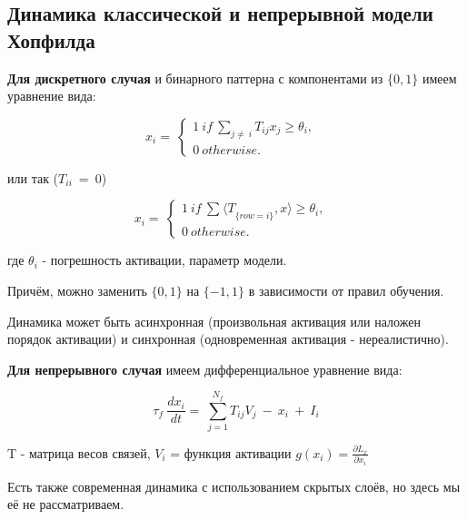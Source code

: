 
\subsection{\texorpdfstring{\textbf{
      Динамика классической и непрерывной модели Хопфилда}}
  {Динамика классической и непрерывной модели Хопфилда}}

\textbf{Для дискретного случая} и бинарного паттерна с компонентами из
\(\{ 0,1\}\) имеем уравнение вида:

\[
  x_{i} = \ \left\{ \begin{array}{r}
    1\ if\ \sum_{j \neq \ i}^{}{T_{ij}x_{j}} \geq \theta_{i},\ \ \\
    0\ otherwise.
  \end{array} \right.\
\]

или так (\(T_{ii}\  = \ 0\))


\[
  x_{i} = \ \left\{ \begin{array}{r}
    1\ if\ \sum_{}^{}{{\langle T}_{\{ row = i\}},x\rangle} \geq \theta_{i},\ \ \\
    0\ otherwise.
  \end{array} \right.\
\]


где \(\theta_{i}\) - погрешность активации, параметр модели. \cite{hopfield1982neural}

Причём, можно заменить \(\{ 0,1\}\) на \(\{ - 1,1\}\) в зависимости от
правил обучения.

Динамика может быть асинхронная (произвольная активация или наложен
порядок активации) и синхронная (одновременная активация - нереалистично).

\textbf{Для непрерывного случая} имеем дифференциальное уравнение вида:

\[
  \tau_{f}\ \frac{dx_{i}}{dt} = \ \sum_{j = 1}^{N_{f}}{T_{ij}V_{j}}\  - \ x_{i}\  + \ I_{i}
\]


T - матрица весов связей, \(V_{i}\) = функция активации
\(g(x_{i}) = \frac{\partial L_{x}}{\partial x_{i}}\) \cite{hopfield1984neurons}

Есть также современная динамика с использованием скрытых слоёв, но здесь
мы её не рассматриваем. \cite{ramsauer2020hopfield}
